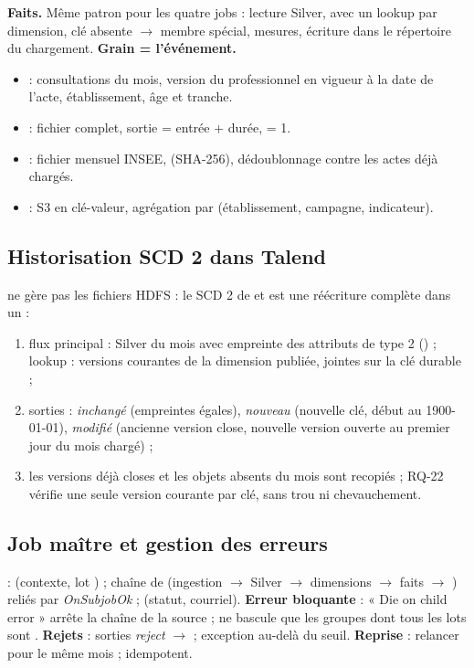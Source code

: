 \textbf{Faits.} Même patron pour les quatre jobs : lecture Silver,  avec un lookup par dimension, clé absente $\rightarrow$ membre spécial, mesures, écriture dans le répertoire du chargement. \textbf{Grain = l'événement.}
\begin{itemize}[nosep]
\item {} : consultations du mois, version du professionnel en vigueur à la date de l'acte, établissement, âge et tranche.
\item {} : fichier complet, sortie = entrée + durée,  = 1.
\item {} : fichier mensuel INSEE,  (SHA-256), dédoublonnage contre les actes déjà chargés.
\item {} : S3 en clé-valeur, agrégation par (établissement, campagne, indicateur).
\end{itemize}

\subsection{Historisation SCD 2 dans Talend}\label{sec:scd-talend}
 ne gère pas les fichiers HDFS : le SCD 2 de  et  est une réécriture complète dans un  :
\begin{enumerate}[nosep]
\item flux principal : Silver du mois avec empreinte des attributs de type 2 () ; lookup : versions courantes de la dimension publiée, jointes sur la clé durable ;
\item sorties : \emph{inchangé} (empreintes égales), \emph{nouveau} (nouvelle clé, début au 1900-01-01), \emph{modifié} (ancienne version close, nouvelle version ouverte au premier jour du mois chargé) ;
\item les versions déjà closes et les objets absents du mois sont recopiés ; RQ-22 vérifie une seule version courante par clé, sans trou ni chevauchement.
\end{enumerate}

\subsection{Job maître et gestion des erreurs}\label{sec:master}
 :  (contexte, lot ) ; chaîne de  (ingestion $\rightarrow$ Silver $\rightarrow$ dimensions $\rightarrow$ faits $\rightarrow$ ) reliés par \emph{OnSubjobOk} ;  (statut, courriel). \textbf{Erreur bloquante} : « Die on child error » arrête la chaîne de la source ;  ne bascule que les groupes dont tous les lots sont . \textbf{Rejets} : sorties \emph{reject} $\rightarrow$  ; exception au-delà du seuil. \textbf{Reprise} : relancer  pour le même mois ; idempotent.

